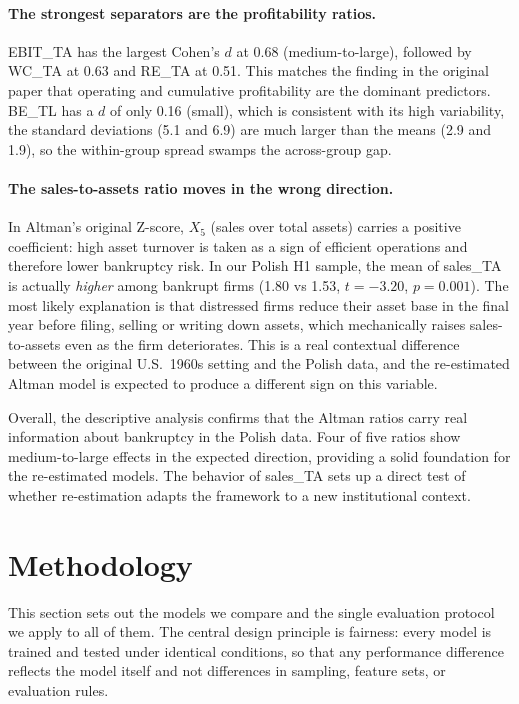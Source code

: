 \documentclass[12pt,a4paper]{article}
\begin{document}
\paragraph{The strongest separators are the profitability ratios.} EBIT\_TA
has the largest Cohen's $d$ at 0.68 (medium-to-large), followed by WC\_TA
at 0.63 and RE\_TA at 0.51. This matches the finding in the original
\cite{altman1968} paper that operating and cumulative profitability are the
dominant predictors. BE\_TL has a $d$ of only 0.16 (small), which is
consistent with its high variability, the standard deviations (5.1 and
6.9) are much larger than the means (2.9 and 1.9), so the within-group
spread swamps the across-group gap.

\paragraph{The sales-to-assets ratio moves in the wrong direction.} In
Altman's original Z-score, $X_5$ (sales over total assets) carries a
positive coefficient: high asset turnover is taken as a sign of efficient
operations and therefore lower bankruptcy risk. In our Polish H1 sample, the
mean of sales\_TA is actually \emph{higher} among bankrupt firms (1.80 vs
1.53, $t = -3.20$, $p = 0.001$). The most likely explanation is that distressed firms reduce their asset
base in the final year before filing, selling or writing down assets, which
mechanically raises sales-to-assets even as the firm deteriorates. This is
a real contextual difference between the original U.S.\ 1960s setting and
the Polish data, and the re-estimated Altman model is expected to produce a
different sign on this variable.

Overall, the descriptive analysis confirms that the Altman ratios carry real
information about bankruptcy in the Polish data. Four of five ratios show
medium-to-large effects in the expected direction, providing a solid
foundation for the re-estimated models. The behavior of sales\_TA sets up
a direct test of whether re-estimation adapts the framework to a new
institutional context.

\clearpage
\section{Methodology}\label{sec:methodology}

This section sets out the models we compare and the single evaluation
protocol we apply to all of them. The central design principle is fairness:
every model is trained and tested under identical conditions, so that any
performance difference reflects the model itself and not differences in
sampling, feature sets, or evaluation rules.
\end{document}
